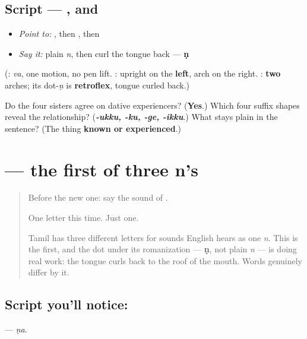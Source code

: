 \subsection*{Script — ,  and }
\begin{quote}
\end{quote}

\begin{itemize}
\raggedright
  \item \emph{Point to:} , then , then 
  \item \emph{Say it:} plain \emph{n}, then curl the tongue back — \textbf{ṇ}
\end{itemize}

(\textbf{}: \emph{va}, one motion, no pen lift. \textbf{}: upright on the \textbf{left}, arch on the right. \textbf{}: \textbf{two} arches; its dot-\emph{ṇ} is \textbf{retroflex}, tongue curled back.)

\begin{tcolorbox}[breakable,colback=teal!4,colframe=teal!35!black,title={Before you move on}]
Do the four sisters agree on dative experiencers? (\textbf{Yes}.) Which four suffix shapes reveal the relationship? (\emph{\textbf{-ukku, -ku, -ge, -ikku}}.) What stays plain in the sentence? (The thing \textbf{known or experienced}.)
\end{tcolorbox}
\section[\texorpdfstring{\ta{ண} (ṇa)}{ண (ṇa)}]{ — the first of three n's}

\label{lesson:TA-S02-nna}



\begin{quote}
Before the new one: say the sound of \textbf{}.

One letter this time. Just one.

Tamil has three different letters for sounds English hears as one \emph{n}. This is the first, and the dot under its romanization — \textbf{ṇ}, not plain \emph{n} — is doing real work: the tongue curls back to the roof of the mouth. Words genuinely differ by it.
\end{quote}

\subsection*{Script you'll notice: }
\textbf{} — \emph{ṇa}.

